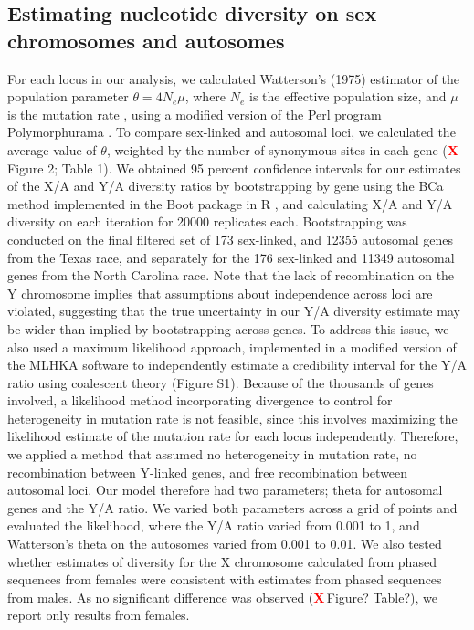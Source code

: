 \documentclass[9pt,twocolumn,twoside]{gsajnl}
\newcommand{\X}{\textcolor{red}{\bf X\,}}
\begin{document}
\subsection*{Estimating nucleotide diversity on sex chromosomes and autosomes}
For each locus in our analysis, we calculated Watterson’s (1975) estimator of the population parameter $\theta=4N_{e}\mu$, where $N_{e}$ is the effective population size, and $\mu$ is the mutation rate \citep{watterson1975}, using a modified version of the Perl program Polymorphurama \citep{bachtrog2006}. To compare sex-linked and autosomal loci, we calculated the average value of $\theta$, weighted by the number of synonymous sites in each gene (\X Figure 2; Table 1). We obtained 95 percent confidence intervals for our estimates of the X/A and Y/A diversity ratios by bootstrapping by gene using the BCa method \citep{efron1994} implemented in the Boot package in R \citep{canty2012boot}, and calculating X/A and Y/A diversity on each iteration for 20000 replicates each. Bootstrapping was conducted on the final filtered set of 173 sex-linked, and 12355 autosomal genes from the Texas race, and separately for the 176 sex-linked and 11349 autosomal genes from the North Carolina race. Note that the lack of recombination on the Y chromosome implies that assumptions about independence across loci are violated, suggesting that the true uncertainty in our Y/A diversity estimate may be wider than implied by bootstrapping across genes. To address this issue, we also used a maximum likelihood approach, implemented in a modified version of the MLHKA software \citep{wright2004hka} to independently estimate a credibility interval for the Y/A ratio using coalescent theory (Figure S1). Because of the thousands of genes involved, a likelihood method incorporating divergence to control for heterogeneity in mutation rate is not feasible, since this involves maximizing the likelihood estimate of the mutation rate for each locus independently.  Therefore, we applied a method that assumed no heterogeneity in mutation rate, no recombination between Y-linked genes, and free recombination between autosomal loci. Our model therefore had two parameters; theta for autosomal genes and the Y/A ratio. We varied both parameters across a grid of points and evaluated the likelihood, where the Y/A ratio varied from 0.001 to 1, and Watterson's theta on the autosomes varied from 0.001 to 0.01. We also tested whether estimates of diversity for the X chromosome calculated from phased sequences from females were consistent with estimates from phased sequences from males. As no significant difference was observed (\X Figure? Table?), we report only results from females.
\end{document}

